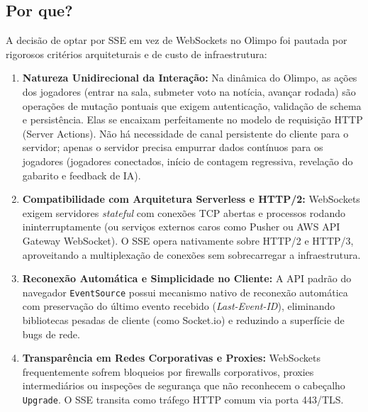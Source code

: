 \documentclass[12pt,a4paper]{article}
\begin{document}
\subsection{Por que?}
A decisão de optar por SSE em vez de WebSockets no Olimpo foi pautada por rigorosos critérios arquiteturais e de custo de infraestrutura:
\begin{enumerate}
  \item \textbf{Natureza Unidirecional da Interação:} Na dinâmica do Olimpo, as ações dos jogadores (entrar na sala, submeter voto na notícia, avançar rodada) são operações de mutação pontuais que exigem autenticação, validação de schema e persistência. Elas se encaixam perfeitamente no modelo de requisição HTTP (Server Actions). Não há necessidade de canal persistente do cliente para o servidor; apenas o servidor precisa empurrar dados contínuos para os jogadores (jogadores conectados, início de contagem regressiva, revelação do gabarito e feedback de IA).
  \item \textbf{Compatibilidade com Arquitetura Serverless e HTTP/2:} WebSockets exigem servidores \textit{stateful} com conexões TCP abertas e processos rodando ininterruptamente (ou serviços externos caros como Pusher ou AWS API Gateway WebSocket). O SSE opera nativamente sobre HTTP/2 e HTTP/3, aproveitando a multiplexação de conexões sem sobrecarregar a infraestrutura.
  \item \textbf{Reconexão Automática e Simplicidade no Cliente:} A API padrão do navegador \texttt{EventSource} possui mecanismo nativo de reconexão automática com preservação do último evento recebido (\textit{Last-Event-ID}), eliminando bibliotecas pesadas de cliente (como Socket.io) e reduzindo a superfície de bugs de rede.
  \item \textbf{Transparência em Redes Corporativas e Proxies:} WebSockets frequentemente sofrem bloqueios por firewalls corporativos, proxies intermediários ou inspeções de segurança que não reconhecem o cabeçalho \texttt{Upgrade}. O SSE transita como tráfego HTTP comum via porta 443/TLS.
\end{enumerate}
\end{document}
